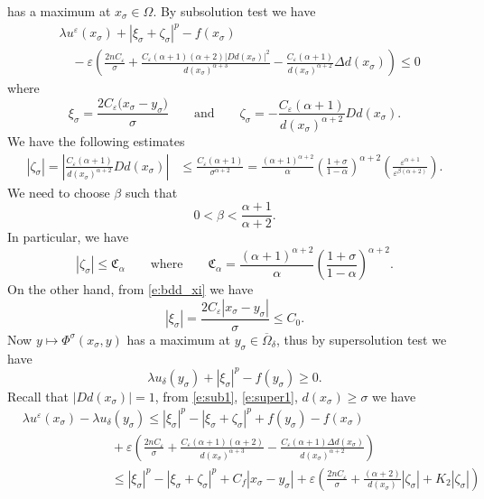 \documentclass[11pt,reqno]{amsart}
\numberwithin{figure}{section}
\theoremstyle{plain}
\theoremstyle{remark}
\numberwithin{equation}{section}
\begin{document}
    has a maximum at $x_\sigma\in \Omega$. By subsolution test we have
\begin{align}\label{e:sub1}
    &\lambda u^\varepsilon(x_\sigma) + \left|\xi_\sigma+\zeta_\sigma\right|^p - f(x_\sigma)\nonumber\\
    &\quad  -\varepsilon\left(\frac{2nC_\varepsilon}{\sigma} + \frac{C_\varepsilon(\alpha+1)(\alpha+2)|D d(x_\sigma)|^2}{d(x_\sigma)^{\alpha+3}}-\frac{C_\varepsilon(\alpha+1)}{d(x_\sigma)^{\alpha+2}}\Delta d(x_\sigma)\right)  \leq 0
\end{align}
where 
\begin{equation}\label{e:est_xi_zeta}
    \xi_\sigma = \frac{2C_\varepsilon\big(x_\sigma-y_\sigma\big)}{\sigma} \qquad\text{and}\qquad \zeta_\sigma = - \frac{C_\varepsilon(\alpha+1)}{d(x_\sigma)^{\alpha+2}}D d(x_\sigma).
\end{equation}
We have the following estimates
\begin{align*}
    |\zeta_\sigma|=\left|\frac{C_\varepsilon(\alpha+1)}{d(x_\sigma)^{\alpha+2}}D d(x_\sigma )\right|
    &\leq \frac{C_\varepsilon(\alpha+1)}{\sigma^{\alpha+2}} = \frac{(\alpha+1)^{\alpha+2}}{\alpha}\left(\frac{1+\sigma}{1-\alpha}\right)^{\alpha+2}\left(\frac{\varepsilon^{\alpha+1}}{\varepsilon^{\beta(\alpha+2)}}\right).
\end{align*}
We need to choose $\beta$ such that
\begin{equation*}
 \displaystyle 0 < \beta < \frac{\alpha+1}{\alpha+2}.
\end{equation*}
In particular, we have
\begin{equation*}
    |\zeta_\sigma|\leq \mathfrak{C}_\alpha \qquad\text{where}\qquad \mathfrak{C}_\alpha =  \frac{(\alpha+1)^{\alpha+2}}{\alpha}\left(\frac{1+\sigma}{1-\alpha}\right)^{\alpha+2}.
\end{equation*}
On the other hand, from \eqref{e:bdd_xi} we have
\begin{equation*}
    |\xi_\sigma| = \frac{2C_\varepsilon|x_\sigma - y_\sigma|}{\sigma} \leq C_0 .
\end{equation*}
Now $y\mapsto \Phi^\sigma(x_\sigma,y)$ has a maximum at $y_\sigma\in \overline{\Omega}_\delta$, thus by supersolution test we have 
\begin{equation}\label{e:super1}
    \lambda u_\delta(y_\sigma) + \left|\xi_\sigma\right|^p - f(y_\sigma) \geq 0.
\end{equation}
Recall that $|D d(x_\sigma)| = 1$, from \eqref{e:sub1}, \eqref{e:super1}, $d(x_\sigma)\geq \sigma$ we have
\begin{align}
    &\lambda u^\varepsilon(x_\sigma) - \lambda u_\delta(y_\sigma) \leq |\xi_\sigma|^p - |\xi_\sigma+\zeta_\sigma|^p + f(y_\sigma) - f(x_\sigma) \nonumber\\
    &\qquad\qquad\qquad\quad + \varepsilon\left(\frac{2nC_\varepsilon}{\sigma} + \frac{C_\varepsilon(\alpha+1)(\alpha+2)}{d(x_\sigma)^{\alpha+3}} - \frac{C_\varepsilon(\alpha+1)\Delta d(x_\sigma)}{d(x_\sigma)^{\alpha+2}}\right)\nonumber \\
    &\qquad\qquad\qquad\quad\leq |\xi_\sigma|^p - |\xi_\sigma+\zeta_\sigma|^p + C_f|x_\sigma - y_\sigma| +\varepsilon \left(\frac{2n C_\varepsilon}{\sigma} + \frac{(\alpha+2)}{d(x_\sigma)}|\zeta_\sigma| + K_2|\zeta_\sigma|\right) \label{e:est3}
\end{align}
\end{document}
